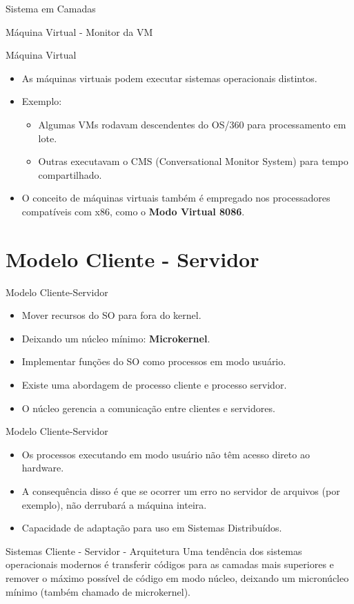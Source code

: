 \documentclass{beamer}
\begin{document}
\begin{frame}{Sistema em Camadas}
\begin{frame}{Máquina Virtual - Monitor da VM}
\end{frame}
\begin{frame}{Máquina Virtual}
    \begin{itemize}
        \item As máquinas virtuais podem executar sistemas operacionais distintos.
        \item Exemplo:
              \begin{itemize}
                  \item Algumas VMs rodavam descendentes do OS/360 para processamento em lote.
                  \item Outras executavam o CMS (Conversational Monitor System) para tempo compartilhado.
              \end{itemize}
        \item O conceito de máquinas virtuais também é empregado nos processadores compatíveis com x86, como o \textbf{Modo Virtual 8086}.
    \end{itemize}
\end{frame}


\section{Modelo Cliente - Servidor}
\begin{frame}{Modelo Cliente-Servidor}
    \begin{itemize}
        \item Mover recursos do SO para fora do kernel.
        \item Deixando um núcleo mínimo: \textbf{Microkernel}.
        \item Implementar funções do SO como processos em modo usuário.
        \item Existe uma abordagem de processo cliente e processo servidor.
        \item O núcleo gerencia a comunicação entre clientes e servidores.
    \end{itemize}
\end{frame}
\begin{frame}{Modelo Cliente-Servidor}
    \begin{itemize}
        \item Os processos executando em modo usuário não têm acesso direto ao hardware.
        \item A consequência disso é que se ocorrer um erro no servidor de arquivos (por exemplo), não derrubará a máquina inteira.
        \item Capacidade de adaptação para uso em Sistemas Distribuídos.
    \end{itemize}
\end{frame}
\begin{frame}{Sistemas Cliente - Servidor - Arquitetura }
    Uma tendência dos sistemas operacionais modernos é transferir códigos para as camadas mais superiores e remover o máximo possível de código em modo núcleo, deixando um micronúcleo mínimo (também chamado de microkernel).
\end{frame}


\end{frame}
\end{document}
